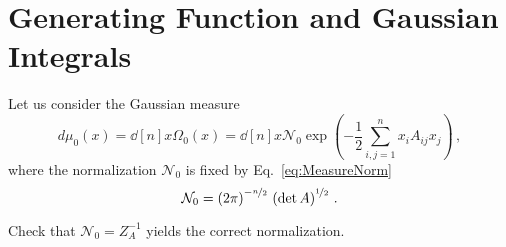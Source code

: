 \documentclass[notes.tex]{subfiles}
\begin{document}
\section{Generating Function and Gaussian Integrals}
\label{sec:gener-funct-gauss}

Let us consider the Gaussian measure
\begin{equation}
  \label{eq:GaussMeas}
  d\mu_0(x) = \dd[n]{x} \Omega_0(x) = \dd[n]{x} \mathcal{N}_0 \exp\left(
    -\frac12 \sum_{i,j=1}^n x_i A_{ij} x_j
    \right)\, ,
\end{equation}
where the normalization $\mathcal{N}_0$ is fixed by Eq.~\ref{eq:MeasureNorm}
\begin{equation}
  \label{eq:GaussNorm}
  \mathcal{N}_0 = \left(2\pi\right)^{-\nicefrac{n}{2}}\, \left( \det A\right)^{\nicefrac{1}{2}}\, .
\end{equation}

\begin{Ex}
  Check that $\mathcal{N}_0=Z_A^{-1}$ yields the correct normalization. 
\end{Ex}
\end{document}
